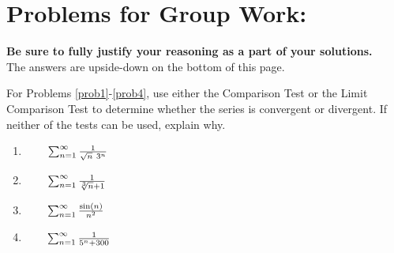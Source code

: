 \pagebreak

\section*{Problems for Group Work:}
\textbf{Be sure to fully justify your reasoning as a part of your solutions.}\\
 The answers are upside-down on the bottom of this page.

For Problems \ref{prob1}-\ref{prob4}, use either the Comparison Test or the Limit Comparison Test to determine whether the series is convergent or divergent. If neither of the tests can be used, explain why.

\begin{enumerate}[{Problem }1:]

\item \(\qquad \Sum \frac{1}{\sqrt{n}\ 3^n}\) \label{prob1}
\vfill

\item \(\qquad\sum_{n=1}^\infty \frac{1}{\sqrt[3]{n}+1}\) \label{prob2}
\vfill

\item \(\qquad\sum_{n=1}^\infty \frac{\sin(n)}{n^2}\) \label{prob3}
\vfill

\item \(\qquad\sum_{n=1}^\infty \frac{1}{5^n +300}\) \label{prob4}
\vfill

\end{enumerate}



